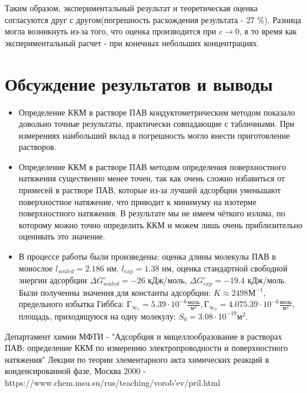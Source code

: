 \documentclass[a4paper,12pt]{article}
\begin{document}
\begin{enumerate}
Таким образом, экспериментальный результат и теоретическая оценка согласуются друг с другом(погрешность расхождения результата - 27 \%). Разница могла возникнуть из-за того, что оценка производится при $c\rightarrow0$, в то время как экспериментальный расчет - при конечных небольших концентрациях.


\end{enumerate}

\section{Обсуждение результатов и выводы}
\begin{itemize}

\item Определение ККМ в растворе ПАВ кондуктометрическим методом показало довольно точные результаты, практически совпадающие с табличными. При измерениях наибольший вклад в погрешность могло внести приготовление растворов.

\item Определение ККМ в растворе ПАВ методом определения поверхностного натяжения существенно менее точен, так как очень сложно избавиться от примесей в растворе ПАВ, которые из-за лучшей адсорбции уменьшают поверхностное натяжение, что приводит к минимуму на изотерме поверхностного натяжения. В результате мы не имеем чёткого излома, по которому можно точно определить ККМ и можем лишь очень приблизительно оценивать это значение.

\item В процессе работы были произведены: оценка длины молекулы ПАВ в монослое $l_{scaled} = 2.186$ нм, $l_{exp} = 1.38$ нм, оценка стандартной свободной энергии адсорбции $ \Delta G^{\circ}_{scaled} = -26$ кДж/моль, $ \Delta G^{\circ}_{exp} = -19.4 $ кДж/моль. Были полученны значения для константы адсорбции: $K \approx 2498 \text{М}^{-1}$, предельного избытка Гиббса:  $\text{Г}_{\infty}_{1} =  5.39 \cdot 10^{-6} \frac{\text{моль}}{\text{м}^{2}}, \text{Г}_{\infty}_{2} = 4.07 5.39 \cdot 10^{-6} \frac{\text{моль}}{\text{м}^{2}}$, площадь, приходящуюся на одну молекулу: $ S_{0} = 3.08\cdot10^{-19}\text{м}^{2}$.

\end{itemize}














\newpage

\begin{thebibliography}{}
      Департамент химии МФТИ -  "Адсорбция и мицеллообразование в растворах ПАВ: определение ККМ по измерению электропроводности и поверхностного натяжения"
      Лекции по теории элементарного акта химических реакций в конденсированной фазе, Москва 2000 - https://www.chem.msu.su/rus/teaching/vorob'ev/pril.html
\end{thebibliography}
\end{document}
